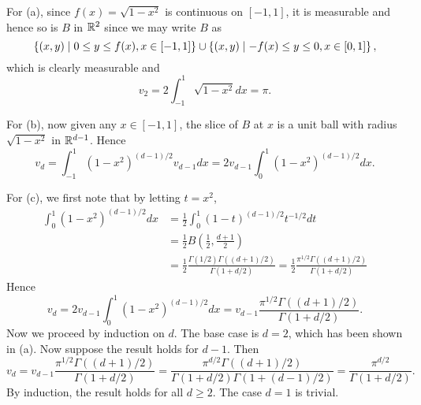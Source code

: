 \begin{pf}
    For (a), since $f(x) = \sqrt{1-x^2}$ is continuous on $[-1,1]$, it is 
    measurable and hence so is $B$ in $\mathbb{R}^2$ since we may write $B$ as 
    \begin{equation*}
        \left\{ (x,y) \;\middle\vert\; 0\leq y\leq f(x), x\in[-1,1] \right\}\cup\left\{ (x,y) \;\middle\vert\; -f(x)\leq y\leq 0, x\in[0,1] \right\}, 
    \end{equation*}
    which is clearly measurable and 
    \begin{equation*}
        v_2 = 2\int_{-1}^{1} \sqrt{1-x^2}dx = \pi.
    \end{equation*} 

    For (b), now given any $x\in[-1,1]$, the slice of $B$ at $x$ 
    is a unit ball with radius $\sqrt{1-x^2}$ in $\mathbb{R}^{d-1}$. Hence 
    \begin{equation*}
        v_d = \int_{-1}^{1} (1-x^2)^{(d-1)/2}v_{d-1}dx = 2v_{d-1}\int_{0}^{1} (1-x^2)^{(d-1)/2}dx.
    \end{equation*}

    For (c), we first note that by letting $t = x^2$,
    \begin{equation*}
        \begin{split}
            \int_{0}^{1} (1-x^2)^{(d-1)/2}dx 
            &= \frac{1}{2}\int_{0}^{1} (1-t)^{(d-1)/2}t^{-1/2}dt \\
            &= \frac{1}{2} B(\frac{1}{2}, \frac{d+1}{2}) \\
            &= \frac{1}{2} \frac{\Gamma(1/2)\Gamma((d+1)/2)}{\Gamma(1+d/2)} = \frac{1}{2} \frac{\pi^{1/2}\Gamma((d+1)/2)}{\Gamma(1+d/2)}
        \end{split}
    \end{equation*}
    Hence 
    \begin{equation*}
        v_d = 2v_{d-1}\int_{0}^{1} (1-x^2)^{(d-1)/2}dx = v_{d-1}\frac{\pi^{1/2}\Gamma((d+1)/2)}{\Gamma(1+d/2)}.
    \end{equation*}
    Now we proceed by induction on $d$. The base case is $d=2$, which has been
    shown in (a). Now suppose the result holds for $d-1$. Then 
    \begin{equation*}
        v_d = v_{d-1}\frac{\pi^{1/2}\Gamma((d+1)/2)}{\Gamma(1+d/2)} = \frac{\pi^{d/2}\Gamma((d+1)/2)}{\Gamma(1+d/2)\Gamma(1+(d-1)/2)} 
        = \frac{\pi^{d/2}}{\Gamma(1+d/2)}.
    \end{equation*}
    By induction, the result holds for all $d\geq 2$. The case $d=1$ is trivial.
\end{pf}

